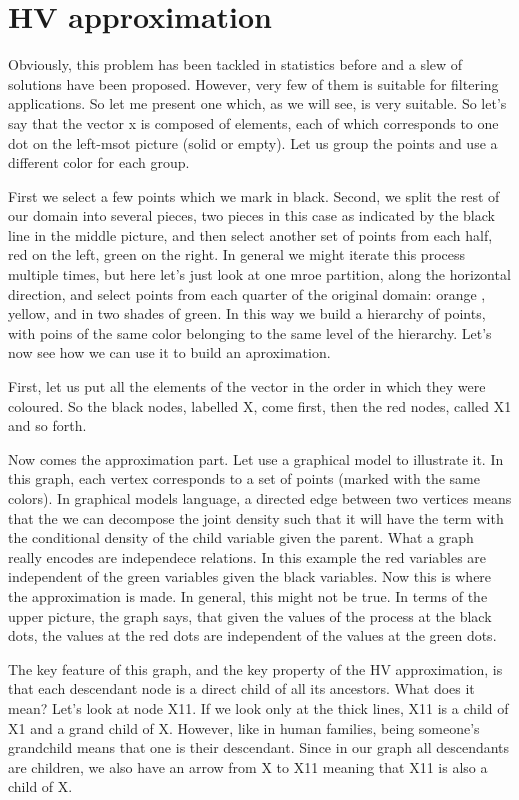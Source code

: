 \documentclass[14pt]{extarticle} %
\begin{document}
\newpage
\section*{HV approximation}

Obviously, this problem has been tackled in statistics before and a slew of solutions have been proposed. However, very few of them is suitable for filtering applications. So let me present one which, as we will see, is very suitable. So let's say that the vector x is composed of elements, each of which corresponds to one dot on the left-msot picture (solid or empty). Let us group the points and use a different color for each group. 

First we select a few points which we mark in black. Second, we split the rest of our domain into several pieces, two pieces in this case as indicated by the black line in the middle picture, and then select another set of points from each half, red on the left, green on the right. In general we might iterate this process multiple times, but here let's just look at one mroe partition, along the horizontal direction, and select points from each quarter of the original domain: orange , yellow, and in two shades of green. In this way we build a hierarchy of points, with poins of the same color belonging to the same level of the hierarchy. Let's now see how we can use it to build an aproximation. 

First, let us put all the elements  of the vector in the order in which they were coloured. So the black nodes, labelled X, come first, then the red nodes, called X1 and so forth.

Now comes the approximation part. Let use a graphical model to illustrate it. In this graph, each vertex corresponds to a set of points (marked with the same colors). In graphical models language, a directed edge between two vertices means that the we can decompose the joint density such that it will have the term with the conditional density of the child variable given the parent. What a graph really encodes are independece relations. In this example the red variables are independent of the green variables given the black variables. Now this is where the approximation is made. In general, this might not be true. In terms of the upper picture, the graph says, that given the values of the process at the black dots, the values at the red dots are independent of the values at the green dots. 

The key feature of this graph, and the key property of the HV approximation, is that each descendant node is a direct child of all its ancestors. What does it mean? Let's look at node X11. If we look only at the thick lines, X11 is a child of X1 and a grand child of X. However, like in human families, being someone's grandchild means that one is their descendant. Since in our graph all descendants are children, we also have an arrow from X to X11 meaning that X11 is also a child of X.
\end{document}
